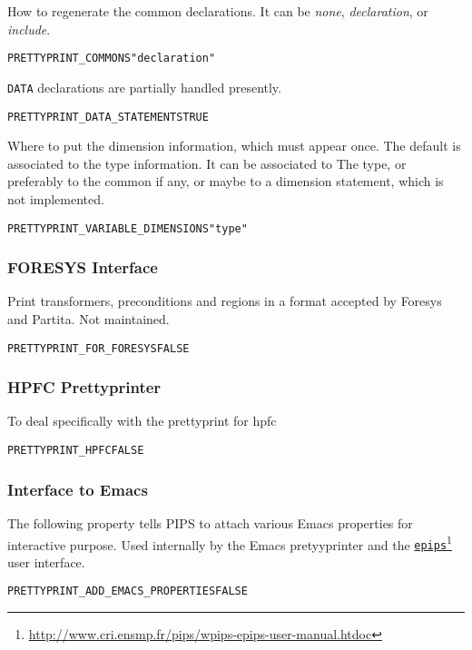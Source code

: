 \documentclass[a4paper]{report}
\newenvironment{PipsProp}{\begin{alltt}}{\end{alltt}}
\newcommand{\LINK}[2]{\href{#2}{#1}\footnote{\url{#2}}\xspace}
\newcommand{\EPIPS}{\LINK{\texttt{epips}}{http://www.cri.ensmp.fr/pips/wpips-epips-user-manual.htdoc}}
\begin{document}
How to regenerate the common declarations.
It can be \emph{none}, \emph{declaration}, or \emph{include}.

\begin{PipsProp}
PRETTYPRINT_COMMONS "declaration"
\end{PipsProp}

\verb/DATA/ declarations are partially handled presently.

\begin{PipsProp}
PRETTYPRINT_DATA_STATEMENTS TRUE
\end{PipsProp}

Where to put the dimension information, which must appear once.
The default is associated to the type information. It can be associated to
The type, or preferably to the common if any, or maybe to a dimension
statement, which is not implemented.

\begin{PipsProp}
PRETTYPRINT_VARIABLE_DIMENSIONS "type"
\end{PipsProp}


\subsubsection{FORESYS Interface}

Print transformers, preconditions and regions in a format accepted by
Foresys and Partita. Not maintained.

\begin{PipsProp}
PRETTYPRINT_FOR_FORESYS FALSE
\end{PipsProp}


\subsubsection{HPFC Prettyprinter}

To deal specifically with the prettyprint for hpfc

\begin{PipsProp}
PRETTYPRINT_HPFC FALSE
\end{PipsProp}


\subsubsection{Interface to Emacs}

The following property tells PIPS to attach various Emacs properties
for interactive purpose. Used internally by the Emacs pretyyprinter and
the \EPIPS{} user interface.
\begin{PipsProp}
PRETTYPRINT_ADD_EMACS_PROPERTIES FALSE
\end{PipsProp}
\end{document}
